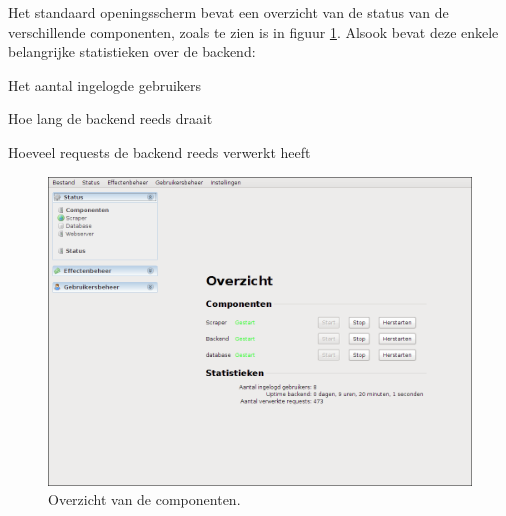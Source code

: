 \begin{figure}
	\centering
\end{figure}

Het standaard openingsscherm bevat een overzicht van de status van de verschillende componenten, zoals te zien is in figuur \ref{fig:handl:admin:status-overzicht}.
Alsook bevat deze enkele belangrijke statistieken over de backend:
\begin{enumerate_compact}
\item Het aantal ingelogde gebruikers
\item Hoe lang de backend reeds draait
\item Hoeveel requests de backend reeds verwerkt heeft
\end{enumerate_compact}

\begin{figure}[h!]
	\centering
		\includegraphics[width=\textwidth]{images/handleiding/administratie/status-overzicht}
	\caption{Overzicht van de componenten.}
		\label{fig:handl:admin:status-overzicht}
\end{figure}

